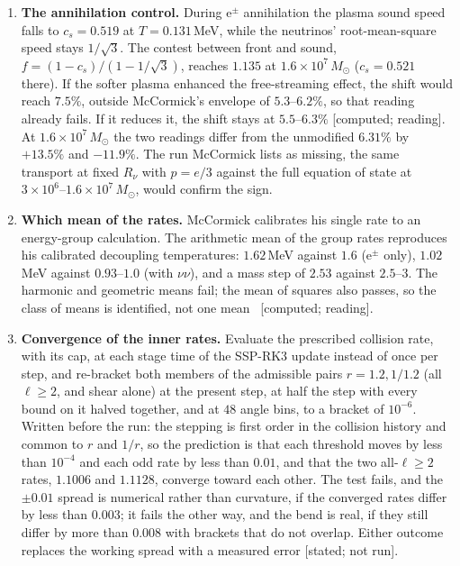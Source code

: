 \documentclass[11pt]{article}
\newcommand{\grade}[1]{\textsf{\small[#1]}}
\begin{document}
\begin{enumerate}
\item \textbf{The annihilation control.} During e$^\pm$ annihilation the plasma sound speed falls to $c_s=0.519$ at $T=0.131$\,MeV, while the neutrinos' root-mean-square speed stays $1/\sqrt3$. The contest between front and sound, $f=(1-c_s)/(1-1/\sqrt3)$, reaches $1.135$ at $1.6\times10^7\,M_\odot$ ($c_s=0.521$ there). If the softer plasma enhanced the free-streaming effect, the shift would reach $7.5\%$, outside McCormick's envelope of $5.3$--$6.2\%$, so that reading already fails. If it reduces it, the shift stays at $5.5$--$6.3\%$ \grade{computed; reading}. At $1.6\times10^7\,M_\odot$ the two readings differ from the unmodified $6.31\%$ by $+13.5\%$ and $-11.9\%$. The run McCormick lists as missing, the same transport at fixed $R_\nu$ with $p=e/3$ against the full equation of state at $3\times10^6$--$1.6\times10^7\,M_\odot$, would confirm the sign.
\item \textbf{Which mean of the rates.} McCormick calibrates his single rate to an energy-group calculation. The arithmetic mean of the group rates reproduces his calibrated decoupling temperatures: $1.62$\,MeV against $1.6$ (e$^\pm$ only), $1.02$\,MeV against $0.93$--$1.0$ (with $\nu\nu$), and a mass step of $2.53$ against $2.5$--$3$. The harmonic and geometric means fail; the mean of squares also passes, so the class of means is identified, not one mean~\cite{WB} \grade{computed; reading}.
\item \textbf{Convergence of the inner rates.} Evaluate the prescribed collision rate, with its cap, at each stage time of the SSP-RK3 update instead of once per step, and re-bracket both members of the admissible pairs $r=1.2,1/1.2$ (all $\ell\ge2$, and shear alone) at the present step, at half the step with every bound on it halved together, and at $48$ angle bins, to a bracket of $10^{-6}$. Written before the run: the stepping is first order in the collision history and common to $r$ and $1/r$, so the prediction is that each threshold moves by less than $10^{-4}$ and each odd rate by less than $0.01$, and that the two all-$\ell\ge2$ rates, $1.1006$ and $1.1128$, converge toward each other. The test fails, and the $\pm0.01$ spread is numerical rather than curvature, if the converged rates differ by less than $0.003$; it fails the other way, and the bend is real, if they still differ by more than $0.008$ with brackets that do not overlap. Either outcome replaces the working spread with a measured error \grade{stated; not run}.
\end{enumerate}
\end{document}
